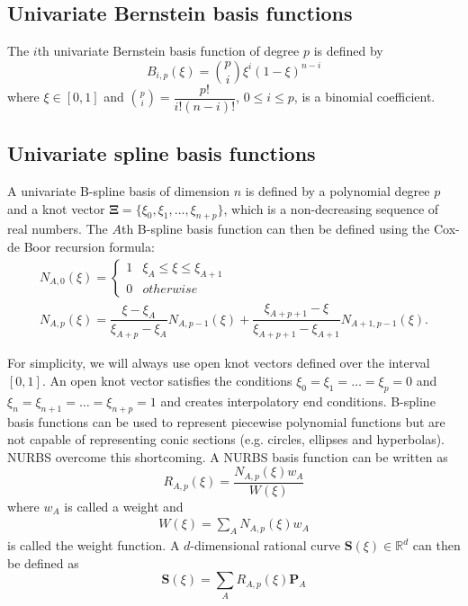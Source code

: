 \documentclass{article}
\newcommand{\rn}{\mathbb{R}^d}
\begin{document}
\subsection{Univariate Bernstein basis functions}
The $i$th univariate Bernstein basis function of degree $p$ is defined by
\begin{equation}
B_{i,p}(\xi)=\binom {p}{i}\xi^i(1-\xi)^{n-i}
\end{equation}
where $\xi\in\left[ 0,1 \right]$ and $\binom {p}{i}=\dfrac{p!}{i!(n-i)!}$, $0\leq{i}\leq{p}$, is a binomial coefficient.
\subsection{Univariate spline basis functions}
A univariate B-spline basis of dimension $n$ is defined by a polynomial degree $p$ and a knot vector $\mathbf{\Xi}=\lbrace{\xi_0,\xi_1,\ldots, \xi_{n+p}}\rbrace$, which is a non-decreasing sequence of real numbers. The $A$th B-spline basis function can then be defined using the Cox-de Boor recursion formula:
\begin{gather}
N_{A,0}(\xi)=\begin{cases}1 & \xi_A\leq{\xi}\leq{\xi_{A+1}}\\0 & otherwise \end{cases} \\
N_{A,p}(\xi)=\dfrac{\xi-\xi_A}{\xi_{A+p}-\xi_A}N_{A,p-1}(\xi)+\dfrac{\xi_{A+p+1}-\xi}{\xi_{A+p+1}-\xi_{A+1}}N_{A+1,p-1}(\xi).
\end{gather}\par
For simplicity, we will always use open knot vectors defined over the interval $\left[ 0,1\right]$. An open knot vector satisfies the conditions $\xi_0=\xi_1=\dots=\xi_{p}=0$ and $\xi_{n}=\xi_{n+1}=\dots=\xi_{n+p}=1$ and creates interpolatory end conditions. B-spline basis functions can be used to represent piecewise polynomial functions but are not capable of representing conic sections (e.g. circles, ellipses and hyperbolas). NURBS overcome this shortcoming. A NURBS basis function can be written as
\begin{equation}
R_{A,p}(\xi)=\dfrac{N_{A,p}(\xi)w_A}{W{(\xi)}}
\end{equation}
where $w_A$ is called a weight and
\begin{align}
  \label{eq:weight}
W(\xi)=\sum_{A} N_{A,p}(\xi)w_A
\end{align}
is called the weight function. A $d$-dimensional rational curve $\mathbf{S}(\xi)\in{\rn}$ can then be defined as
\begin{equation}
\mathbf{S}(\xi)=\sum_A R_{A,p}(\xi)\mathbf{P}_A
\end{equation}
\end{document}
